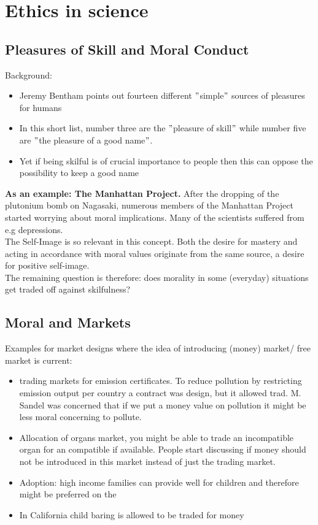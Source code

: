 

\chapter{Ethics in science}

\section{Pleasures of Skill and Moral Conduct}

Background:
\begin{itemize}
	\item Jeremy Bentham points out fourteen different $"$simple$"$ sources of pleasures for humans
	\item In this short list, number three are the $"$pleasure of skill$"$ while number five are $"$the pleasure of a good name$"$.
	\item Yet if being skilful is of crucial importance to people then this can oppose the possibility to keep a good name
\end{itemize}
  
  
  
\textbf{As an example: The Manhattan Project.} After the dropping of the plutonium bomb on Nagasaki, numerous members of the Manhattan Project started worrying about moral implications. Many of the scientists suffered from e.g depressions. \\ 

The Self-Image is so relevant in this concept. Both the desire for mastery and acting in accordance with moral values originate from the same source, a desire for positive self-image. \\ 

The remaining question is therefore: does morality in some (everyday) situations get traded off against skilfulness?

\section{Moral and Markets}


Examples for market designs where the idea of introducing (money) market/ free market is current:
\begin{itemize}
	\item trading markets for emission certificates. To reduce pollution by restricting emission output per country a contract was design, but it allowed trad. M. Sandel was concerned that if we put a money value on pollution it might be less moral concerning to pollute.
	\item Allocation of organs market, you might be able to trade an incompatible organ for an compatible if available. People start discussing if money should not be introduced in this market instead of just the trading market.
	\item Adoption: high income families can provide well for children and therefore might be preferred on the 
	\item In California child baring is allowed to be traded for money 
\end{itemize}

